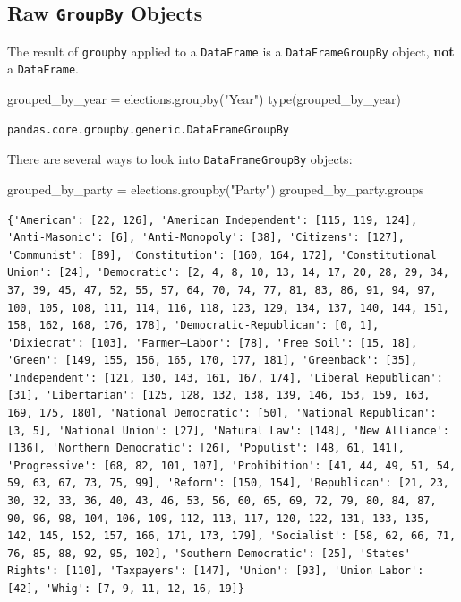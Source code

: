 \documentclass[
  letterpaper,
  DIV=11,
  numbers=noendperiod]{scrreprt}
\newenvironment{Shaded}{\begin{snugshade}}{\end{snugshade}}
\newcommand{\BuiltInTok}[1]{\textcolor[rgb]{0.00,0.23,0.31}{#1}}
\newcommand{\NormalTok}[1]{\textcolor[rgb]{0.00,0.23,0.31}{#1}}
\newcommand{\OperatorTok}[1]{\textcolor[rgb]{0.37,0.37,0.37}{#1}}
\newcommand{\StringTok}[1]{\textcolor[rgb]{0.13,0.47,0.30}{#1}}
\begin{document}
\subsection{\texorpdfstring{Raw \texttt{GroupBy}
Objects}{Raw GroupBy Objects}}\label{raw-groupby-objects}

The result of \texttt{groupby} applied to a \texttt{DataFrame} is a
\texttt{DataFrameGroupBy} object, \textbf{not} a \texttt{DataFrame}.

\begin{Shaded}
\begin{Highlighting}[]
\NormalTok{grouped\_by\_year }\OperatorTok{=}\NormalTok{ elections.groupby(}\StringTok{"Year"}\NormalTok{)}
\BuiltInTok{type}\NormalTok{(grouped\_by\_year)}
\end{Highlighting}
\end{Shaded}

\begin{verbatim}
pandas.core.groupby.generic.DataFrameGroupBy
\end{verbatim}

There are several ways to look into \texttt{DataFrameGroupBy} objects:

\begin{Shaded}
\begin{Highlighting}[]
\NormalTok{grouped\_by\_party }\OperatorTok{=}\NormalTok{ elections.groupby(}\StringTok{"Party"}\NormalTok{)}
\NormalTok{grouped\_by\_party.groups}
\end{Highlighting}
\end{Shaded}

\begin{verbatim}
{'American': [22, 126], 'American Independent': [115, 119, 124], 'Anti-Masonic': [6], 'Anti-Monopoly': [38], 'Citizens': [127], 'Communist': [89], 'Constitution': [160, 164, 172], 'Constitutional Union': [24], 'Democratic': [2, 4, 8, 10, 13, 14, 17, 20, 28, 29, 34, 37, 39, 45, 47, 52, 55, 57, 64, 70, 74, 77, 81, 83, 86, 91, 94, 97, 100, 105, 108, 111, 114, 116, 118, 123, 129, 134, 137, 140, 144, 151, 158, 162, 168, 176, 178], 'Democratic-Republican': [0, 1], 'Dixiecrat': [103], 'Farmer–Labor': [78], 'Free Soil': [15, 18], 'Green': [149, 155, 156, 165, 170, 177, 181], 'Greenback': [35], 'Independent': [121, 130, 143, 161, 167, 174], 'Liberal Republican': [31], 'Libertarian': [125, 128, 132, 138, 139, 146, 153, 159, 163, 169, 175, 180], 'National Democratic': [50], 'National Republican': [3, 5], 'National Union': [27], 'Natural Law': [148], 'New Alliance': [136], 'Northern Democratic': [26], 'Populist': [48, 61, 141], 'Progressive': [68, 82, 101, 107], 'Prohibition': [41, 44, 49, 51, 54, 59, 63, 67, 73, 75, 99], 'Reform': [150, 154], 'Republican': [21, 23, 30, 32, 33, 36, 40, 43, 46, 53, 56, 60, 65, 69, 72, 79, 80, 84, 87, 90, 96, 98, 104, 106, 109, 112, 113, 117, 120, 122, 131, 133, 135, 142, 145, 152, 157, 166, 171, 173, 179], 'Socialist': [58, 62, 66, 71, 76, 85, 88, 92, 95, 102], 'Southern Democratic': [25], 'States' Rights': [110], 'Taxpayers': [147], 'Union': [93], 'Union Labor': [42], 'Whig': [7, 9, 11, 12, 16, 19]}
\end{verbatim}
\end{document}
